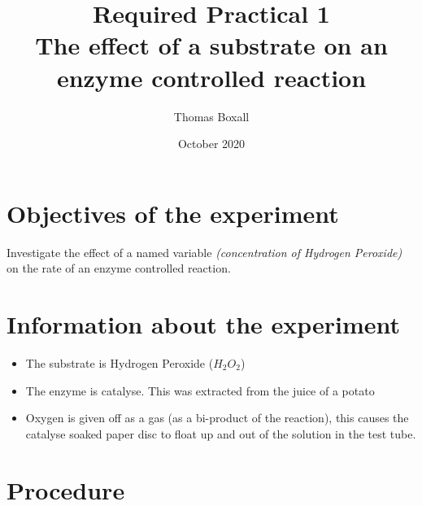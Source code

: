 \documentclass{thomasClass}
\title{\textbf{Required Practical 1}
\\The effect of a substrate on an enzyme controlled reaction}
\author{Thomas Boxall}
\date{October 2020}
\begin{document}
\maketitle

\section{Objectives of the experiment}
 Investigate the effect of a named variable \textit{(concentration of Hydrogen Peroxide)} on the rate of an enzyme controlled reaction.
 
\section{Information about the experiment}
\begin{itemize}
    \item The substrate is Hydrogen Peroxide ($H_2O_2$)
    \item The enzyme is catalyse. This was extracted from the juice of a potato
    \item Oxygen is given off as a gas (as a bi-product of the reaction), this causes the catalyse soaked paper disc to float up and out of the solution in the test tube.
\end{itemize}

\section{Procedure}
\end{document}
